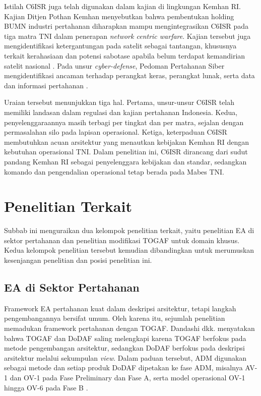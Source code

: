 Istilah C6ISR juga telah digunakan dalam kajian di lingkungan Kemhan RI. Kajian Ditjen Pothan Kemhan menyebutkan bahwa pembentukan holding BUMN industri pertahanan diharapkan mampu mengintegrasikan C6ISR pada tiga matra TNI dalam penerapan \textit{network centric warfare}. Kajian tersebut juga mengidentifikasi ketergantungan pada satelit sebagai tantangan, khususnya terkait kerahasiaan dan potensi sabotase apabila belum terdapat kemandirian satelit nasional \cite{Dwipratama2023}. Pada unsur \textit{cyber-defense}, Pedoman Pertahanan Siber mengidentifikasi ancaman terhadap perangkat keras, perangkat lunak, serta data dan informasi pertahanan \cite{Permenhan82Tahun2014}.

Uraian tersebut menunjukkan tiga hal. Pertama, unsur-unsur C6ISR telah memiliki landasan dalam regulasi dan kajian pertahanan Indonesia. Kedua, penyelenggaraannya masih terbagi per tingkat dan per matra, sejalan dengan permasalahan silo pada lapisan operasional. Ketiga, keterpaduan C6ISR membutuhkan acuan arsitektur yang menautkan kebijakan Kemhan RI dengan kebutuhan operasional TNI. Dalam penelitian ini, C6ISR dirancang dari sudut pandang Kemhan RI sebagai penyelenggara kebijakan dan standar, sedangkan komando dan pengendalian operasional tetap berada pada Mabes TNI.

\section{Penelitian Terkait}
\label{sec:II.8}

Subbab ini menguraikan dua kelompok penelitian terkait, yaitu penelitian EA di sektor pertahanan dan penelitian modifikasi TOGAF untuk domain khusus. Kedua kelompok penelitian tersebut kemudian dibandingkan untuk merumuskan kesenjangan penelitian dan posisi penelitian ini.

\subsection{EA di Sektor Pertahanan}
\label{sec:II.8.1}

Framework EA pertahanan kuat dalam deskripsi arsitektur, tetapi langkah pengembangannya bersifat umum. Oleh karena itu, sejumlah penelitian memadukan framework pertahanan dengan TOGAF. Dandashi dkk. menyatakan bahwa TOGAF dan DoDAF saling melengkapi karena TOGAF berfokus pada metode pengembangan arsitektur, sedangkan DoDAF berfokus pada deskripsi arsitektur melalui sekumpulan \textit{view}. Dalam paduan tersebut, ADM digunakan sebagai metode dan setiap produk DoDAF dipetakan ke fase ADM, misalnya AV-1 dan OV-1 pada Fase Preliminary dan Fase A, serta model operasional OV-1 hingga OV-6 pada Fase B \cite{Dandashi2006}.


